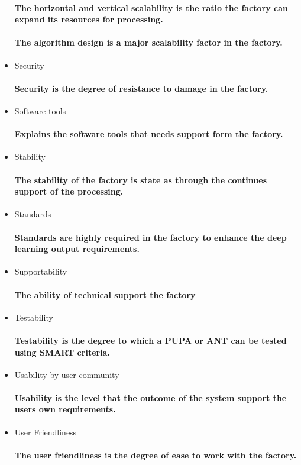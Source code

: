 \documentclass{acm_proc_article-sp}
\begin{document}
\begin{itemize}
\paragraph{The horizontal and vertical scalability is the ratio the factory can expand its resources for processing.}
\paragraph{The algorithm design is a major scalability factor in the factory.}
\item Security
\paragraph{Security is the degree of resistance to damage in the factory.}
\item Software tools
\paragraph{Explains the software tools that needs support form the factory.}
\item Stability
\paragraph{The stability of the factory is state as through the continues support of the processing.}
\item Standards
\paragraph{Standards are highly required in the factory to enhance the deep learning output requirements.}
\item Supportability
\paragraph{The ability of technical support the factory}
\item Testability
\paragraph{Testability is the degree to which a PUPA or ANT can be tested using SMART criteria.}
\item Usability by user community
\paragraph{Usability is the level that the outcome of the system support the users own requirements.}
\item User Friendliness
\paragraph{The user friendliness is the degree of ease to work with the factory.}
\end{itemize}
\end{document}
